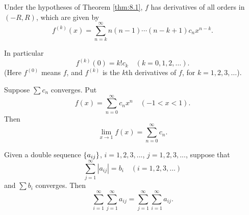 
\begin{myCorollary*}
    Under the hypotheses of Theorem \ref{thm:8.1}, 
    $f$ has derivatives of all orders in $(-R, R)$, 
    which are given by
    \begin{equation}
        \label{eq:8.6}
        f^{(k)} (x) = 
        \sum_{n=k}^{\infty} n(n-1)\cdots(n-k+1) c_n x^{n-k}.
    \end{equation}
    
    In particular
    \begin{equation}
        \label{eq:8.7}
        f^{(k)} (0) = k! c_k
        \quad 
        (k = 0,1,2,\dots).
    \end{equation}
    (Here $f^{(0)}$ means $f$, and $f^{(k)}$ is the $k$th derivatives of $f$,
    for $k = 1,2,3,\dots$).
\end{myCorollary*}


\begin{thm}
    \label{thm:8.2}
    Suppose $\sum c_n$ converges.
    Put 
    \begin{equation*}
        f(x) = \sum_{n=0}^{\infty} c_n x^n 
        \quad (-1 < x < 1).
    \end{equation*}
    Then
    \begin{equation}
        \label{eq:8.8}
        \lim_{x \to 1} f(x) = 
        \sum_{n=0}^{\infty} c_n.
    \end{equation}
\end{thm}


\begin{thm}
    \label{thm:8.3}
    Given a double sequence $\protect\{a_{ij}\}$, 
    $i = 1, 2, 3, ...$, 
    $j = 1, 2, 3, ...$,
    suppose that
    \begin{equation}
        \label{eq:8.12}
        \sum_{j=1}^{\infty} \left| a_{ij} \right| = b_i
        \quad (i = 1,2,3,\dots)
    \end{equation}
    and $\sum b_i$ converges. Then
    \begin{equation}
        \label{eq:8.13}
        \sum_{i=1}^{\infty} 
        \sum_{j=1}^{\infty} a_{ij} =
        \sum_{j=1}^{\infty} 
        \sum_{i=1}^{\infty} a_{ij} .
    \end{equation}
\end{thm}


